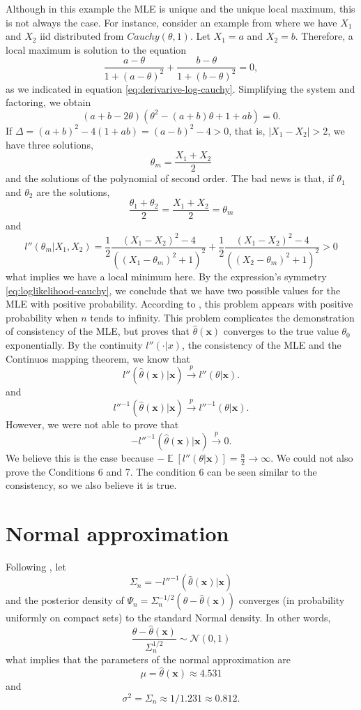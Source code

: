 \documentclass[a4paper,10pt, notitlepage]{report}
\theoremstyle{plain}
\newcommand{\ev}{\operatorname{\mathbb{E}}}
\newcommand{\bx}{\boldsymbol{x}} %
\begin{document}
Although in this example the MLE is unique and the unique local maximum, this
is not always the case.  For instance, consider an example from \cite[Page 122]{young_smith_2005} where we have $X_1$ and $X_2$ iid distributed
from $Cauchy(\theta,1)$. Let $X_1 = a$ and $X_2 = b$. Therefore, a local maximum is solution to the
equation 
$$
\frac{a - \theta}{1 + (a - \theta)^2} + \frac{b - \theta}{1 + (b - \theta)^2} = 0,
$$
as we indicated in equation \ref{eq:derivarive-log-cauchy}. Simplifying the
system and factoring, we obtain 
$$
(a + b - 2\theta)(\theta^2 - (a + b)\theta + 1 + ab) = 0.
$$
If $\Delta = (a+b)^2 - 4(1 + ab) = (a - b)^2 - 4 > 0$, that is, $|X_1 - X_2|
> 2$, we have three solutions, 
$$
\theta_m = \frac{X_1 + X_2}{2}
$$
and the solutions of the polynomial of second order. The bad news is that, if
$\theta_1$ and $\theta_2$ are the solutions, 
$$
\frac{\theta_1 + \theta_2}{2} = \frac{X_1 + X_2}{2} = \theta_m
$$
and 
$$l''(\theta_m|X_1, X_2) = \frac{1}{2}\frac{(X_1 - X_2)^2 - 4}{((X_1 -
\theta_m)^2 + 1)^2} + \frac{1}{2}\frac{(X_1 - X_2)^2 - 4}{((X_2 -
\theta_m)^2 + 1)^2} > 0
$$
what implies we have a local minimum here. By the expression's symmetry \ref{eq:loglikelihood-cauchy}, we conclude that we have two possible values for the MLE with positive probability. According to \cite{young_smith_2005}, this problem appears with positive probability when $n$ tends to infinity. This problem complicates the demonstration of consistency of the MLE, but \cite{consistency-mle} proves that $\hat{\theta}(\bx)$ converges to the true value $\theta_0$ exponentially. By the continuity $l''(\cdot|x)$, the consistency of the MLE and the Continuos mapping theorem, we know that 
$$
l''(\hat{\theta}(\bx)|\bx) \overset{p}{\to} l''(\theta|\bx). 
$$
and
$$
l''^{-1}(\hat{\theta}(\bx)|\bx) \overset{p}{\to} l''^{-1}(\theta|\bx).
$$
However, we were not able to prove that 
$$
-l''^{-1}(\hat{\theta}(\bx)|\bx) \overset{p}{\to} 0.
$$
We believe this is the case because $-\ev[l''(\theta|\bx)] = \frac{n}{2} \to \infty$. We could not also prove the Conditions 6 and 7. The condition 6 can be seen similar to the consistency, so we also believe it is true. 

\section*{Normal approximation}

Following \cite[Theorem 7.89]{schervish1996theory}, let 
$$
\Sigma_n = -l''^{-1}(\hat{\theta}(\bx)|\bx)
$$
and the posterior density of $\Psi_n = \Sigma_n^{-1/2}(\theta - \hat{\theta}(\bx))$ converges (in probability uniformly on compact sets) to the standard Normal density. In other words, 
$$
\frac{\theta - \hat{\theta}(\bx)}{\Sigma_n^{1/2}} \sim \mathcal{N}(0,1)
$$
what implies that the parameters of the normal approximation are 
\begin{equation}
    \label{eq:mu-normal-approximation}
    \mu = \hat{\theta}(\bx) \approx 4.531
\end{equation}
and 
\begin{equation}
    \label{eq:sigma-normal-approximation}
    \sigma^2 = \Sigma_n \approx 1/1.231 \approx 0.812.
\end{equation}
\end{document}
